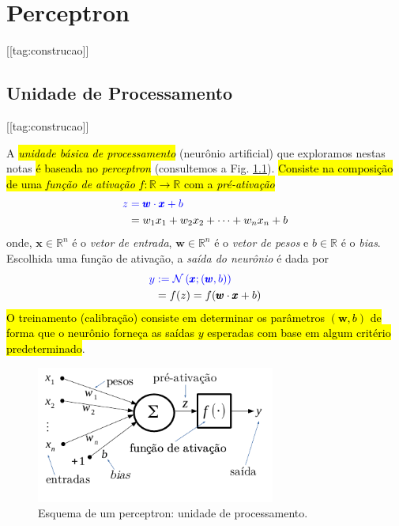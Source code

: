 
\chapter{Perceptron}\label{cap_perceptron}
\thispagestyle{fancy}
[[tag:construcao]]


\section{Unidade de Processamento}\label{cap_perceptron_sec_unit}
[[tag:construcao]]

A \hl{\emph{unidade básica de processamento}} (neurônio artificial) que exploramos nestas notas \hl{é baseada no \emph{perceptron}} (consultemos a Fig. \ref{fig:perceptron}). \hl{Consiste na composição de uma \emph{função de ativação} $f:\mathbb{R}\to\mathbb{R}$ com a \emph{pré-ativação}}
\begin{align}
  \color{blue}z &\color{blue}= \pmb{w}\cdot\pmb{x} + b \\
    &= w_1x_1 + w_2x_2 + \cdots + w_nx_n + b
\end{align}
onde, $\pmb{x}\in\mathbb{R}^{n}$ é o \emph{vetor de entrada}, $\pmb{w}\in\mathbb{R}^{n}$ é o \emph{vetor de pesos} e $b\in\mathbb{R}$ é o \emph{\textit{bias}}. Escolhida uma função de ativação, a \emph{saída do neurônio} é dada por
\begin{align}
  \color{blue}y &\color{blue}:= \mathcal{N}\left(\pmb{x};(\pmb{w},b)\right)\\
    &= f(z) = f(\pmb{w}\cdot\pmb{x} + b)
\end{align}
\hl{O treinamento (calibração) consiste em determinar os parâmetros $(\pmb{w}, b)$ de forma que o neurônio forneça as saídas $y$ esperadas com base em algum critério predeterminado}.

\begin{figure}[H]
  \centering
  \includegraphics[width=0.7\textwidth]{./cap_perceptron/dados/fig_perceptron/fig}
  \caption{Esquema de um perceptron: unidade de processamento.}
  \label{fig:perceptron}
\end{figure}

